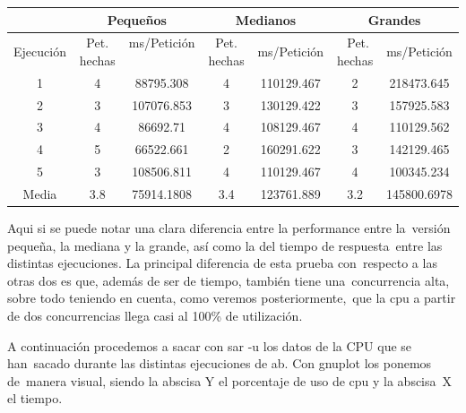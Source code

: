 \documentclass[11pt,twoside,a4paper]{book}
\begin{document}
\begin{center}
\small
\begin{tabular}{ |c|c|c|c|c|c|c| }
 \hline
  & \multicolumn{2}{|c}{Pequeños} & \multicolumn{2}{|c|}{Medianos} & \multicolumn{2}{c|}{Grandes} \\
 \hline
 Ejecución & Pet. hechas & ms/Petición \
 & Pet. hechas & ms/Petición &\
 Pet. hechas & ms/Petición \\
 \hline
 1 & 4 & 88795.308 & 4 & 110129.467 & 2 & 218473.645 \\
 \hline
 2 & 3 & 107076.853 & 3 & 130129.422 & 3 & 157925.583 \\
 \hline
 3 & 4 & 86692.71 & 4 & 108129.467 & 4 & 110129.562 \\
 \hline
 4 & 5 & 66522.661 & 2 & 160291.622 & 3 & 142129.465 \\
 \hline
 5 & 3 & 108506.811 & 4 & 110129.467 & 4 & 100345.234 \\
 \hline
 Media & 3.8 & 75914.1808 & 3.4 & 123761.889 & 3.2 & 145800.6978 \\
 \hline
\end{tabular}
\end{center}

Aqui si se puede notar una clara diferencia entre la performance entre la\
versión pequeña, la mediana y la grande, así como la del tiempo de respuesta\
entre las distintas ejecuciones. La principal diferencia de esta prueba con\
respecto a las otras dos es que, además de ser de tiempo, también tiene una\
concurrencia alta, sobre todo teniendo en cuenta, como veremos posteriormente,\
que la cpu a partir de dos concurrencias llega casi al 100\% de utilización.

A continuación procedemos a sacar con sar -u los datos de la CPU que se han\
sacado durante las distintas ejecuciones de ab. Con gnuplot los ponemos de\
manera visual, siendo la abscisa Y el porcentaje de uso de cpu y la abscisa\
X el tiempo.

\end{document}

